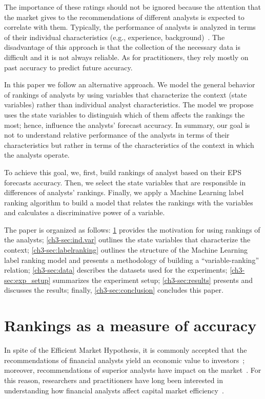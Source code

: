 \documentclass[a4paper,12pt,openright,notitlepage]{report}\usepackage[]{graphicx}\usepackage[]{color}
\begin{document}
The importance of these ratings should not be ignored because the attention that the market gives to the recommendations of different analysts is expected to correlate with them. Typically, the performance of analysts is analyzed in terms of their individual characteristics (e.g., experience, background)~\citep{clement1999}. The disadvantage of this approach is that the collection of the necessary data is difficult and it is not always reliable. As for practitioners, they rely mostly on past accuracy to predict future accuracy.

In this paper we follow an alternative approach.  We model the general behavior of rankings of analysts by using variables that characterize the context (state variables) rather than individual analyst characteristics. The model we propose uses the state variables to distinguish which of them  affects the rankings the most; hence, influence the analysts' forecast accuracy. In summary, our goal is not to understand  relative performance of the analysts  in terms of their characteristics but rather in terms of the characteristics of the context in which the analysts operate.


To achieve this goal, we, first, build rankings of analyst based on their EPS forecasts accuracy. Then, we select the state variables that  are responsible in differences of analysts' rankings. Finally, we apply a Machine Learning label ranking algorithm to build a model that relates the rankings with the variables and calculates  a discriminative power of a variable.

The paper is organized as follows: \ref{ch3-sec:ranking} provides the motivation for using rankings of the analysts; \ref{ch3-sec:ind.var} outlines the state variables that characterize the context; \ref{ch3-sec:labelranking} outlines the structure of the Machine Learning label ranking model and presents a methodology of building a ``variable-ranking'' relation; \ref{ch3-sec:data} describes the datasets used for the experiments; \ref{ch3-sec:exp_setup} summarizes the experiment setup;  \ref{ch3-sec:results} presents and discusses the results; finally, \ref{ch3-sec:conclusion} concludes this paper.


\section{Rankings as a measure of accuracy}
\label{ch3-sec:ranking}
In spite of the Efficient Market Hypothesis, it is commonly accepted that the recommendations of financial analysts yield an economic value to investors~\citep{womack1996}; moreover, recommendations of superior analysts have impact on the market~\citep{loh2011}. For this reason, researchers and practitioners have long been interested in understanding how financial analysts affect capital market efficiency~\citep{ramnath2008faf}.
\end{document}
